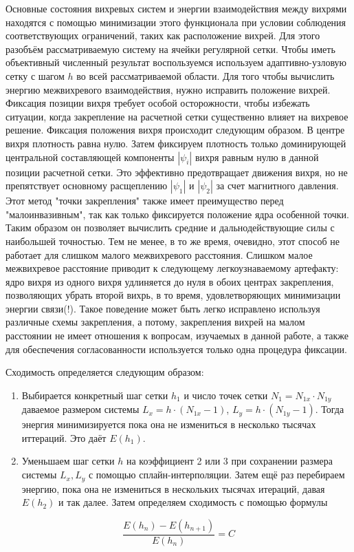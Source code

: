 Основные состояния вихревых систем и энергии взаимодействия между вихрями 
находятся с помощью минимизации этого функционала при условии соблюдения 
соответствующих ограничений, таких как расположение вихрей. Для этого разобъём 
рассматриваемую систему на ячейки регулярной сетки. Чтобы иметь объективный 
численный результат воспользуемся используем адаптивно-узловую сетку с шагом 
\( h \) во всей рассматриваемой области. Для того чтобы вычислить энергию 
межвихревого взаимодействия, нужно исправить положение вихрей. Фиксация 
позиции вихря требует особой осторожности, чтобы избежать ситуации, когда 
закрепление на расчетной сетки существенно влияет на вихревое решение. 
Фиксация положения вихря происходит следующим образом. В центре вихря 
плотность равна нулю. Затем фиксируем плотность только доминирующей 
центральной составляющей компоненты \( |\psi_i| \) вихря равным нулю в данной 
позиции расчетной сетки. Это эффективно предотвращает движения вихря, но не 
препятствует основному расщеплению \( |\psi_1| \) и \( |\psi_2| \) за счет 
магнитного давления. Этот метод "точки закрепления" также имеет преимущество 
перед "малоинвазивным", так как только фиксируется положение ядра особенной 
точки. Таким образом он позволяет вычислить средние и дальнодействующие силы 
с наибольшей точностью. Тем не менее, в то же время, очевидно, этот способ не 
работает для слишком малого межвихревого расстояния. Слишком малое межвихревое 
расстояние приводит к следующему легкоузнаваемому артефакту: ядро вихря из 
одного вихря удлиняется до нуля в обоих центрах закрепления, позволяющих 
убрать второй вихрь, в то время, удовлетворяющих минимизации энергии связи(!). 
Такое поведение может быть легко исправлено используя различные схемы 
закрепления, а потому, закрепления вихрей на малом расстоянии не имеет 
отношения к вопросам, изучаемых в данной работе, а также для обеспечения 
согласованности используется только одна процедура фиксации.

Сходимость определяется следующим образом:
\begin{enumerate}
    \item Выбирается конкретный шаг сетки \( h_1 \) и число точек сетки 
        \( N_1 = N_{1x} \cdot N_{1y} \) даваемое размером системы
        \( L_x = h \cdot (N_{1x}-1) \), \( L_y = h \cdot (N_{1y}-1) \). 
        Тогда энергия минимизируется пока она не измениться в несколько
        тысячах иттераций. Это даёт \( E(h_1) \).
    \item Уменьшаем шаг сетки \( h \) на коэффициент 2 или 3 при сохранении 
        размера системы \( L_x, L_y \) с помощью сплайн-интерполяции. 
        Затем ещё раз перебираем энергию, пока она не измениться в 
        нескольких тысячах итераций, давая \( E(h_2) \) и так далее. 
        Затем определяем сходимость с помощью формулы
\end{enumerate}
\begin{equation}
    \frac{E(h_n) - E(h_{n+1})}{E(h_n)} = C
\end{equation}

